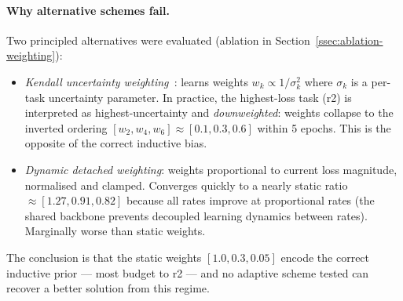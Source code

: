 \paragraph{Why alternative schemes fail.}
Two principled alternatives were evaluated (ablation in
Section~\ref{ssec:ablation-weighting}):
\begin{itemize}
  \item \textit{Kendall uncertainty weighting~\cite{kendall2018multi}}:
    learns weights $w_k \propto 1/\sigma_k^2$ where $\sigma_k$ is a per-task
    uncertainty parameter.
    In practice, the highest-loss task (r2) is interpreted as highest-uncertainty
    and \emph{downweighted}: weights collapse to the inverted ordering
    $[w_2, w_4, w_6] \approx [0.1, 0.3, 0.6]$ within 5 epochs.
    This is the opposite of the correct inductive bias.

  \item \textit{Dynamic detached weighting}:
    weights proportional to current loss magnitude, normalised and clamped.
    Converges quickly to a nearly static ratio $\approx [1.27, 0.91, 0.82]$
    because all rates improve at proportional rates (the shared backbone
    prevents decoupled learning dynamics between rates).
    Marginally worse than static weights.
\end{itemize}

The conclusion is that the static weights $[1.0, 0.3, 0.05]$ encode the
correct inductive prior --- most budget to r2 --- and no adaptive scheme
tested can recover a better solution from this regime.

